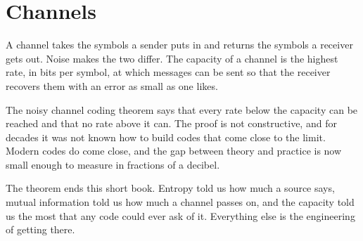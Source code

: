 \documentclass[10pt]{article}
\begin{document}
\newpage

\section{Channels}
A channel takes the symbols a sender puts in and returns the symbols a
receiver gets out. Noise makes the two differ. The capacity of a channel is
the highest rate, in bits per symbol, at which messages can be sent so that
the receiver recovers them with an error as small as one likes.

The noisy channel coding theorem says that every rate below the capacity can
be reached and that no rate above it can. The proof is not constructive, and
for decades it was not known how to build codes that come close to the limit.
Modern codes do come close, and the gap between theory and practice is now
small enough to measure in fractions of a decibel.

The theorem ends this short book. Entropy told us how much a source says,
mutual information told us how much a channel passes on, and the capacity
told us the most that any code could ever ask of it. Everything else is the
engineering of getting there.
\end{document}
